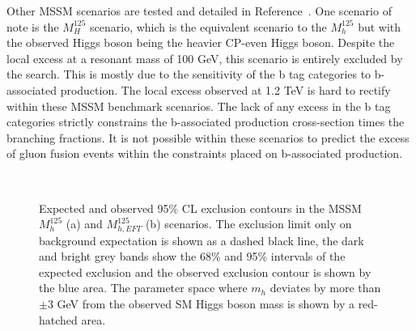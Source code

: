 Other \ac{MSSM} scenarios are tested and detailed in Reference~\cite{CMS:2022rbd}.
One scenario of note is the $M_{H}^{125}$ scenario, which is the equivalent scenario to the $M_{h}^{125}$ but with the observed Higgs boson being the heavier \ac{CP}-even Higgs boson.
Despite the local excess at a resonant mass of 100 GeV, this scenario is entirely excluded by the search. 
This is mostly due to the sensitivity of the b tag categories to b-associated production.
The local excess observed at 1.2 TeV is hard to rectify within these \ac{MSSM} benchmark scenarios.
The lack of any excess in the b tag categories strictly constrains the b-associated production cross-section times the branching fractions.
It is not possible within these scenarios to predict the excess of gluon fusion events within the constraints placed on b-associated production. \\

\begin{figure}[!hbtp]
\centering
     \\
\caption[Plots of the model-dependent limits in MSSM benchmark scenarios.]{Expected and observed 95\% CL exclusion contours in the MSSM $M_{h}^{125}$ (a) and $M_{h,EFT}^{125}$ (b) scenarios. The exclusion limit only on background expectation is shown as a dashed black line, the dark and bright grey bands show the 68\% and 95\% intervals of the expected exclusion and the observed exclusion contour is shown by the blue area. The parameter space where $m_{h}$ deviates by more than $\pm$3  GeV from the observed SM Higgs boson mass is shown by a red-hatched area.~\cite{CMS:2022rbd}
}
\label{fig:mssm_limits}
\end{figure}

